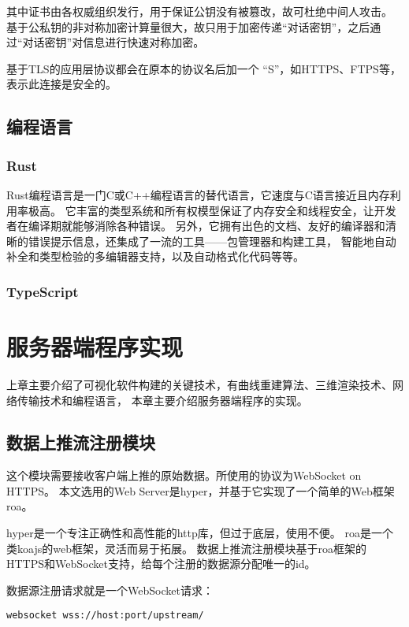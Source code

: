 其中证书由各权威组织发行，用于保证公钥没有被篡改，故可杜绝中间人攻击。
基于公私钥的非对称加密计算量很大，故只用于加密传递“对话密钥”，之后通过“对话密钥”对信息进行快速对称加密。

基于TLS的应用层协议都会在原本的协议名后加一个 “S”，如HTTPS、FTPS等，表示此连接是安全的。

\subsection{编程语言}

\subsubsection{Rust}
Rust编程语言\cite{rust}是一门C或C++编程语言的替代语言，它速度与C语言接近且内存利用率极高。
它丰富的类型系统和所有权模型保证了内存安全和线程安全，让开发者在编译期就能够消除各种错误。
另外，它拥有出色的文档、友好的编译器和清晰的错误提示信息，还集成了一流的工具——包管理器和构建工具，
智能地自动补全和类型检验的多编辑器支持，以及自动格式化代码等等。

\subsubsection{TypeScript}

\section{服务器端程序实现}
\label{sec:server}
上章主要介绍了可视化软件构建的关键技术，有曲线重建算法、三维渲染技术、网络传输技术和编程语言，
本章主要介绍服务器端程序的实现。
 
\subsection{数据上推流注册模块}
这个模块需要接收客户端上推的原始数据。所使用的协议为WebSocket on HTTPS。
本文选用的Web Server是hyper\cite{hyper}，并基于它实现了一个简单的Web框架roa\cite{roa}。

hyper是一个专注正确性和高性能的http库，但过于底层，使用不便。
roa是一个类koajs\cite{koajs}的web框架，灵活而易于拓展。
数据上推流注册模块基于roa框架的HTTPS和WebSocket支持，给每个注册的数据源分配唯一的id。

数据源注册请求就是一个WebSocket请求：

\begin{lstlisting}[label={lst:register-source},caption={发起数据源注册请求}]
websocket wss://host:port/upstream/
\end{lstlisting}

